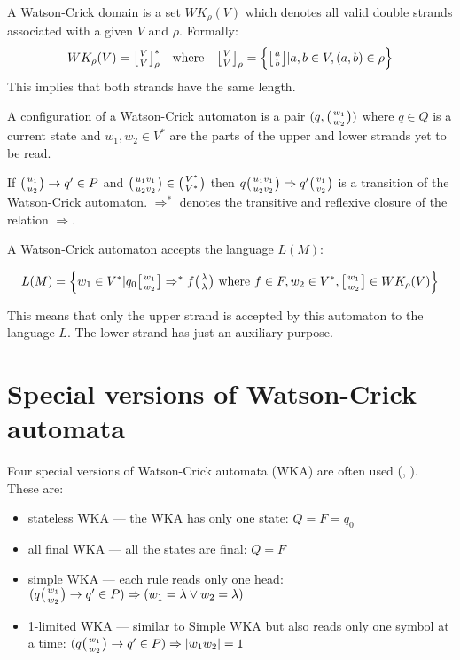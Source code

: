 A Watson-Crick domain is a set $WK_{\rho}(V)$ which denotes all valid double strands associated with a given $V$ and $\rho$. Formally:
\begin{align}
	WK_{\rho}(V) = \wkdomain{V}{V}_{\rho}^{*} && \textnormal{where} && \wkdomain{V}{V}_{\rho} = \Big\{\wkdomain{a}{b} | a, b \in V, (a, b) \in \rho \Big\}
\end{align}
This implies that both strands have the same length.

A configuration of a Watson-Crick automaton is a pair $(q, \wkpair{w_1}{w_2})$ where $q \in Q$ is a current state and $w_1, w_2 \in V^*$ are the parts of the upper and lower strands yet to be read.

If $\wkpair{u_1}{u_2} \rightarrow q' \in P$ and $\wkpair{u_1 v_1}{u_2 v_2} \in \wkpair{V^*}{V^*}$ then $q \wkpair{u_1 v_1}{u_2 v_2} \Rightarrow q' \wkpair{v_1}{v_2}$ is a transition of the Watson-Crick automaton. $\Rightarrow^*$ denotes the transitive and reflexive closure of the relation $\Rightarrow$.

A Watson-Crick automaton accepts the language $L(M)$:

$$L(M) = \Big\{w_1 \in V^* | q_0 \wkdomain{w_1}{w_2} \Rightarrow^* f \wkpair{\lambda}{\lambda} \textnormal{ where } f \in F, w_2 \in V^*, \wkdomain{w_1}{w_2} \in WK_{\rho}(V)\Big\}$$

This means that only the upper strand is accepted by this automaton to the language $L$. The lower strand has just an auxiliary purpose.

\section{Special versions of Watson-Crick automata}
Four special versions of Watson-Crick automata (WKA) are often used (\cite{DETERM_WKA}, \cite{STATE_COMPL}). These are:
\begin{itemize}
  \item{stateless WKA --- the WKA has only one state: $Q = F = {q_0}$}
  \item{all final WKA --- all the states are final: $Q = F$}
  \item{simple WKA --- each rule reads only one head: $(q \wkpair{w_1}{w_2} \rightarrow q' \in P) \Rightarrow (w_1 = \lambda \vee w_2 = \lambda)$}
  \item{1-limited WKA --- similar to Simple WKA but also reads only one symbol at a time: $(q\wkpair{w_1}{w_2} \rightarrow q' \in P) \Rightarrow |w_1 w_2| = 1$}
\end{itemize}

